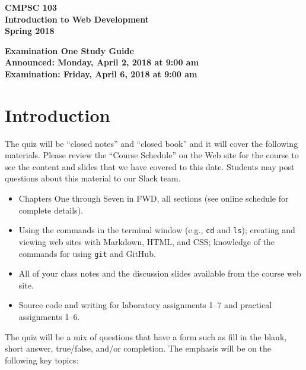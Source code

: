 \documentclass[11pt]{article}
\newcommand{\assignmentduedate}{April 6}
\newcommand{\assignmentassignedate}{April 2}
\newcommand{\assignmentnumber}{One}
\newcommand{\labyear}{2018}
\newcommand{\assignedday}{Monday}
\newcommand{\dueday}{Friday}
\newcommand{\labtime}{9:00 am}
\newcommand{\assigneddate}{Announced: \assignedday, \assignmentassignedate, \labyear{} at \labtime{}}
\newcommand{\duedate}{Examination: \dueday, \assignmentduedate, \labyear{} at \labtime{}}
\newcommand{\program}[1]{\lstinline{#1}}
\newcommand{\guidetitle}[1]
{
  \begin{center}
    \begin{center}
      \bf
      CMPSC 103\\Introduction to Web Development\\
      Spring 2018\\
      \medskip
    \end{center}
    \bf
    #1
  \end{center}
}
\begin{document}
\thispagestyle{empty}

\guidetitle{Examination \assignmentnumber{} Study Guide \\ \assigneddate{} \\ \duedate{}}

\section*{Introduction}

\noindent
The quiz will be ``closed notes'' and ``closed book'' and it will cover the
following materials. Please review the ``Course Schedule'' on the Web site for
the course to see the content and slides that we have covered to this date.
Students may post questions about this material to our Slack team.

\begin{itemize}

  \itemsep 0in

  \item Chapters One through Seven in FWD, all sections (see online schedule for
    complete details).

  \item Using the commands in the terminal window (e.g., \program{cd} and
    \program{ls}); creating and viewing web sites with Markdown, HTML, and CSS;
    knowledge of the commands for using \program{git} and GitHub.

  \item All of your class notes and the discussion slides available from the
    course web site.

  \item Source code and writing for laboratory assignments 1--7 and practical
    assignments 1--6.

\end{itemize}

\noindent The quiz will be a mix of questions that have a form such as fill in
the blank, short answer, true/false, and/or completion. The emphasis will be on
the following key topics:
\end{document}
